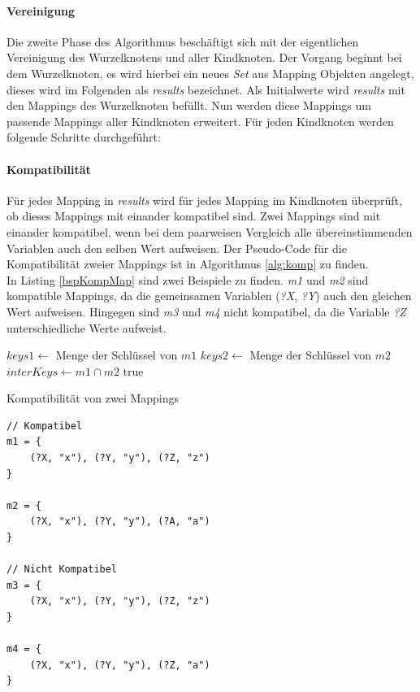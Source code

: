 \documentclass[draft,final]{vutinfth} %
\begin{document}
\paragraph{Vereinigung}
Die zweite Phase des Algorithmus beschäftigt sich mit der eigentlichen Vereinigung des Wurzelknotens und aller Kindknoten. Der Vorgang beginnt bei dem Wurzelknoten, es wird hierbei ein neues \textit{Set} aus Mapping Objekten angelegt, dieses wird im Folgenden als \textit{results} bezeichnet. Als Initialwerte wird \textit{results} mit den Mappings des Wurzelknoten befüllt. Nun werden diese Mappings um passende Mappings aller Kindknoten erweitert. Für jeden Kindknoten werden folgende Schritte durchgeführt:

\paragraph{Kompatibilität}
Für jedes Mapping in \textit{results} wird für jedes Mapping im Kindknoten überprüft, ob dieses Mappings mit einander kompatibel sind. Zwei Mappings sind mit einander kompatibel, wenn bei dem paarweisen Vergleich alle übereinstimmenden Variablen auch den selben Wert aufweisen. Der Pseudo-Code für die Kompatibilität zweier Mappings ist in Algorithmus \ref{alg:komp} zu finden. \\ In Listing \ref{bspKompMap} sind zwei Beispiele zu finden. \textit{m1} und \textit{m2} sind kompatible Mappings, da die gemeinsamen Variablen (\textit{?X}, \textit{?Y}) auch den gleichen Wert aufweisen. Hingegen sind \textit{m3} und \textit{m4} nicht kompatibel, da die Variable \textit{?Z} unterschiedliche Werte aufweist.

\begin{algorithm}
\BlankLine
$keys1\leftarrow$ Menge der Schlüssel von $m1$\;
$keys2\leftarrow$ Menge der Schlüssel von $m2$\;
$interKeys\leftarrow m1\cap m2$\;
\Return true\;
\caption{Kompatibilität von zwei Mappings}\label{alg:komp}
\end{algorithm}

\begin{lstlisting}[float,caption={Beispiele für Kompatibilität von zwei Mappings},frame=single,label={bspKompMap}]
// Kompatibel
m1 = {
	(?X, "x"), (?Y, "y"), (?Z, "z")	
}

m2 = {
	(?X, "x"), (?Y, "y"), (?A, "a")	
}

// Nicht Kompatibel
m3 = {
	(?X, "x"), (?Y, "y"), (?Z, "z")	
}

m4 = {
	(?X, "x"), (?Y, "y"), (?Z, "a")	
}
\end{lstlisting}
\end{document}
